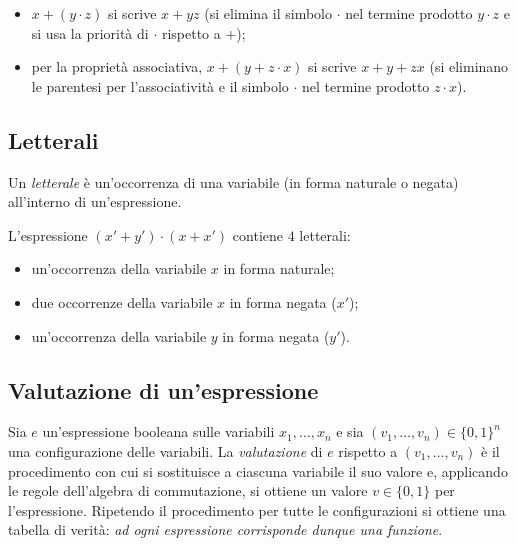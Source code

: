 \documentclass[11pt,a4paper]{article}
\begin{document}
\begin{esempio}
\begin{itemize}
    \item $x + (y \cdot z)$ si scrive $x + yz$ (si elimina il simbolo $\cdot$
          nel termine prodotto $y \cdot z$ e si usa la priorità di $\cdot$
          rispetto a $+$);
    \item per la proprietà associativa, $x + (y + z \cdot x)$ si scrive
          $x + y + zx$ (si eliminano le parentesi per l'associatività e il
          simbolo $\cdot$ nel termine prodotto $z \cdot x$).
\end{itemize}
\end{esempio}

\subsection{Letterali}

Un \emph{letterale} è un'occorrenza di una variabile (in forma naturale o
negata) all'interno di un'espressione.

\begin{esempio}
L'espressione $(x' + y') \cdot (x + x')$ contiene $4$ letterali:
\begin{itemize}
    \item un'occorrenza della variabile $x$ in forma naturale;
    \item due occorrenze della variabile $x$ in forma negata ($x'$);
    \item un'occorrenza della variabile $y$ in forma negata ($y'$).
\end{itemize}
\end{esempio}

\subsection{Valutazione di un'espressione}

Sia $e$ un'espressione booleana sulle variabili $x_1, \dots, x_n$ e sia
$(v_1, \dots, v_n) \in \{0,1\}^n$ una configurazione delle variabili. La
\emph{valutazione} di $e$ rispetto a $(v_1, \dots, v_n)$ è il procedimento con
cui si sostituisce a ciascuna variabile il suo valore e, applicando le regole
dell'algebra di commutazione, si ottiene un valore $v \in \{0,1\}$ per
l'espressione. Ripetendo il procedimento per tutte le configurazioni si ottiene
una tabella di verità: \emph{ad ogni espressione corrisponde dunque una
funzione}.
\end{document}
